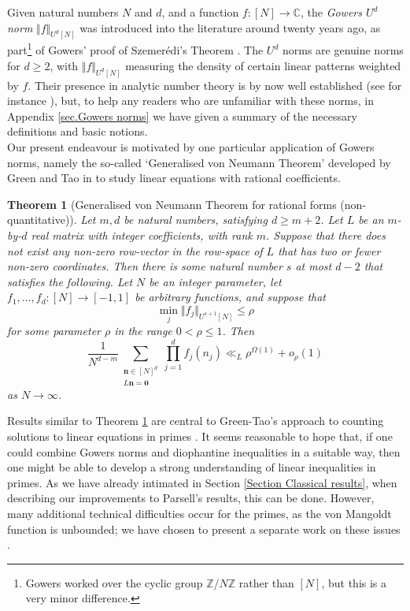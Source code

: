 \documentclass[12pt,a4paper,twoside,reqno]{amsart}
\newtheorem{Theorem}{Theorem}
\numberwithin{equation}{section}
\begin{document}
Given natural numbers $N$ and $d$, and a function $f:[N] \longrightarrow \mathbb{C}$, the \emph{Gowers $U^d$ norm} $\Vert f\Vert_{U^{d}[N]}$ was introduced into the literature around twenty years ago, as part\footnote{Gowers worked over the cyclic group $\mathbb{Z}/N\mathbb{Z}$ rather than $[N]$, but this is a very minor difference.} of Gowers' proof of Szemerédi's Theorem \cite{Go01}. The $U^d$ norms are genuine norms for $d \geqslant 2$, with $\Vert f \Vert_{U^d[N]}$ measuring the density of certain linear patterns weighted by $f$. Their presence in analytic number theory is by now well established (see for instance \cite{GT08, GT10, TT18, TT19}), but, to help any readers who are unfamiliar with these norms, in Appendix \ref{sec.Gowers norms} we have given a summary of the necessary definitions and basic notions. \\

Our present endeavour is motivated by one particular application of Gowers norms, namely the so-called `Generalised von Neumann Theorem' developed by Green and Tao in \cite{GT08, GT10} to study linear equations with rational coefficients. 

\begin{Theorem}[Generalised von Neumann Theorem for rational forms (non-quantitative)]
\label{Linear equations in bounded functions non quantitative}
Let $m,d$ be natural numbers, satisfying $d\geqslant m+2$. Let $L$ be an $m$-by-$d$ real matrix with integer coefficients, with rank $m$. Suppose that there does not exist any non-zero row-vector in the row-space of $L$ that has two or fewer non-zero coordinates. Then there is some natural number $s$ at most $d-2$ that satisfies the following. Let $N$ be an integer parameter, let $f_1,\dots,f_d:[N]\longrightarrow [-1,1]$ be arbitrary functions, and suppose that \[ \min_j \Vert f_j\Vert_{U^{s+1}[N]} \leqslant \rho \] for some parameter $\rho$ in the range $0<\rho \leqslant 1$. Then $$\frac{1}{N^{d-m}}\sum\limits_{\substack{\mathbf{n}\in [N]^d\\ L\mathbf{n} = \mathbf{0}}} \prod\limits_{j=1}^d f_j(n_j) \ll_L  \rho^{\Omega(1)} + o_\rho(1)$$ as $N\rightarrow \infty$.
\end{Theorem}



Results similar to Theorem \ref{Linear equations in bounded functions non quantitative} are central to Green-Tao's approach to counting solutions to linear equations in primes \cite{GT10}. It seems reasonable to hope that, if one could combine Gowers norms and diophantine inequalities in a suitable way, then one might be able to develop a strong understanding of linear inequalities in primes. As we have already intimated in Section \ref{Section Classical results}, when describing our improvements to Parsell's results, this can be done. However, many additional technical difficulties occur for the primes, as the von Mangoldt function is unbounded; we have chosen to present a separate work on these issues \cite{Wa19}. 
\end{document}
